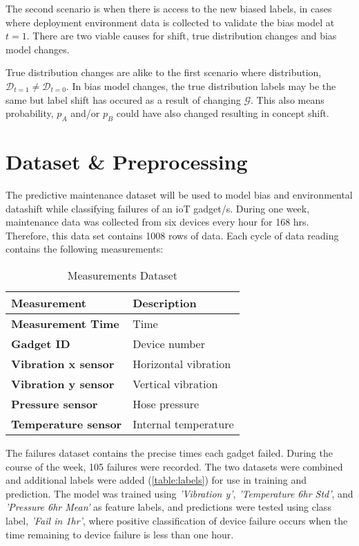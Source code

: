 The second scenario is when there is access to the new biased labels, 
in cases where deployment environment data is collected to validate the bias model at $t = 1$.
There are two viable causes for shift, true distribution changes and bias model changes.

True distribution changes are alike to the first scenario where distribution, $\mathcal{D}_{t=1} \neq \mathcal{D}_{t=0}$.
In bias model changes, the true distribution labels may be the same but label shift has occured as a result of changing $\mathcal{G}$.
This also means probability, $p_A$ and/or $p_B$ could have also changed resulting in concept shift.


\section{Dataset \& Preprocessing}
The predictive maintenance dataset \cite{ahonen} will be used to model bias and environmental datashift while classifying failures of an ioT gadget/s.
During one week, maintenance data was collected from six devices every hour for 168 hrs.
Therefore, this data set contains 1008 rows of data. 
Each cycle of data reading contains the following measurements: 

\begin{table}[H]
    \begin{center}
        \caption{Measurements Dataset} 
        \begin{tabular}{ ll } 
         \toprule
         \textbf{Measurement} & \textbf{Description} \\  [0.5ex] 
         \midrule
         \textbf{Measurement Time} & Time \\
         \textbf{Gadget ID} & Device number \\
         \textbf{Vibration x sensor} & Horizontal vibration \\ 
         \textbf{Vibration y sensor} & Vertical vibration \\ 
         \textbf{Pressure sensor} & Hose pressure \\
         \textbf{Temperature sensor} & Internal temperature \\
         \bottomrule
        \end{tabular}
    \end{center}
\end{table}

The failures dataset contains the precise times each gadget failed. 
During the course of the week, 105 failures were recorded. 
The two datasets were combined and additional labels were added (\ref{table:labels}) for use in training and prediction.
The model was trained using \textit{'Vibration y'}, \textit{'Temperature 6hr Std'}, 
and \textit{'Pressure 6hr Mean'} as feature labels, and predictions were tested using class label, \textit{'Fail in 1hr'},
where positive classification of device failure occurs when the time remaining to device failure is less than one hour.

